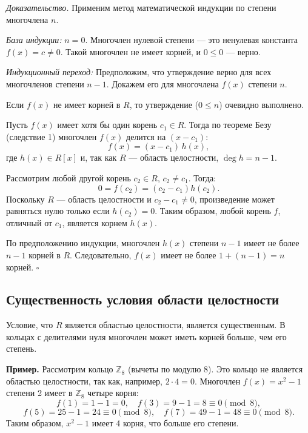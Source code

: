 \documentclass[a4paper,12pt]{article}
\theoremstyle{definition}
\theoremstyle{plain}
\theoremstyle{remark}
\begin{document}
	\medskip
	\textit{Доказательство.}
	Применим метод математической индукции по степени многочлена \( n \).
	
	\textit{База индукции:} \( n = 0 \). Многочлен нулевой степени — это ненулевая константа \( f(x) = c \neq 0 \). Такой многочлен не имеет корней, и \( 0 \leq 0 \) — верно.
	
	\textit{Индукционный переход:} Предположим, что утверждение верно для всех многочленов степени \( n-1 \). Докажем его для многочлена \( f(x) \) степени \( n \).
	
	Если \( f(x) \) не имеет корней в \( R \), то утверждение (\( 0 \leq n \)) очевидно выполнено.
	
	Пусть \( f(x) \) имеет хотя бы один корень \( c_1 \in R \). Тогда по теореме Безу (следствие 1) многочлен \( f(x) \) делится на \( (x - c_1) \):
	\[
	f(x) = (x - c_1) \, h(x),
	\]
	где \( h(x) \in R[x] \) и, так как \( R \) — область целостности, \( \deg h = n-1 \).
	
	Рассмотрим любой другой корень \( c_2 \in R \), \( c_2 \neq c_1 \). Тогда:
	\[
	0 = f(c_2) = (c_2 - c_1) h(c_2).
	\]
	Поскольку \( R \) — область целостности и \( c_2 - c_1 \neq 0 \), произведение может равняться нулю только если \( h(c_2) = 0 \). Таким образом, любой корень \( f \), отличный от \( c_1 \), является корнем \( h(x) \).
	
	По предположению индукции, многочлен \( h(x) \) степени \( n-1 \) имеет не более \( n-1 \) корней в \( R \). Следовательно, \( f(x) \) имеет не более \( 1 + (n-1) = n \) корней. \hfill \(\square\)
	
	\subsection{Существенность условия области целостности}
	
	Условие, что \( R \) является областью целостности, является существенным. В кольцах с делителями нуля многочлен может иметь корней больше, чем его степень.
	
	\medskip
	\noindent \textbf{Пример.} Рассмотрим кольцо \( \mathbb{Z}_8 \) (вычеты по модулю 8). Это кольцо не является областью целостности, так как, например, \( 2 \cdot 4 = 0 \). Многочлен \( f(x) = x^2 - 1 \) степени 2 имеет в \( \mathbb{Z}_8 \) четыре корня:
	\[
	f(1) = 1 - 1 = 0, \quad f(3) = 9 - 1 = 8 \equiv 0 \pmod{8},
	\]
	\[
	f(5) = 25 - 1 = 24 \equiv 0 \pmod{8}, \quad f(7) = 49 - 1 = 48 \equiv 0 \pmod{8}.
	\]
	Таким образом, \( x^2 - 1 \) имеет 4 корня, что больше его степени.
	
\end{document}
